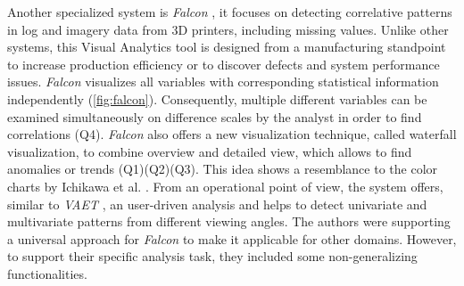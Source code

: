 \documentclass[electronic]{vgtc}             %
\begin{document}
Another specialized system is \textit{Falcon}  \cite{steed:2017}, it focuses on detecting correlative patterns in log and imagery data from 3D printers, including missing values.
Unlike other systems, this Visual Analytics tool is designed from a manufacturing standpoint to increase production efficiency or to discover defects and system performance issues.
\textit{Falcon} visualizes all variables with corresponding statistical information independently (\autoref{fig:falcon}). 
Consequently, multiple different variables can be examined simultaneously  on difference scales by the analyst in order to find correlations (Q4).
\textit{Falcon}  also offers a new visualization technique, called waterfall visualization, to combine overview and detailed view, which allows to find anomalies or trends (Q1)(Q2)(Q3). 
This idea shows a resemblance to the color charts by Ichikawa et al. \cite{ichikawa:2002}.
From an operational point of view, the system offers, similar to \textit{VAET} \cite{Xie:2014}, an user-driven analysis and helps to detect univariate and multivariate patterns from different viewing angles.
The authors were supporting a universal approach for \textit{Falcon} to make it applicable for other domains. 
However, to support their specific analysis task, they included some non-generalizing functionalities. 
\end{document}
